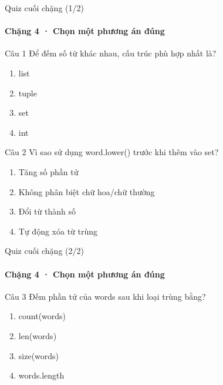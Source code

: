 \documentclass[aspectratio=169,10pt]{beamer}
\begin{document}
\begin{frame}[t]{Quiz cuối chặng (1/2)}
\framesubtitle{Chặng 4 · Chọn một phương án đúng}
\small
\begin{block}{Câu 1}
Để đếm số từ khác nhau, cấu trúc phù hợp nhất là?\par\smallskip
\begin{enumerate}
\item list
\item tuple
\item set
\item int
\end{enumerate}
\end{block}
\begin{block}{Câu 2}
Vì sao sử dụng word.lower() trước khi thêm vào set?\par\smallskip
\begin{enumerate}
\item Tăng số phần tử
\item Không phân biệt chữ hoa/chữ thường
\item Đổi từ thành số
\item Tự động xóa từ trùng
\end{enumerate}
\end{block}

\end{frame}

\begin{frame}[t]{Quiz cuối chặng (2/2)}
\framesubtitle{Chặng 4 · Chọn một phương án đúng}
\small
\begin{block}{Câu 3}
Đếm phần tử của words sau khi loại trùng bằng?\par\smallskip
\begin{enumerate}
\item count(words)
\item len(words)
\item size(words)
\item words.length
\end{enumerate}
\end{block}

\end{frame}
\end{document}
